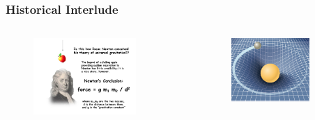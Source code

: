\documentclass{beamer}
\begin{document}
\begin{frame}
\frametitle{Historical Interlude}

  \begin{columns}[c]


    \begin{figure}[htb!]
      \centering
      \includegraphics[width=0.8\textwidth]{fig.Newton.jpg}
    \end{figure}


    \begin{figure}[htb!]
      \centering
      \includegraphics[width=0.8\textwidth]{fig.Einstein.jpg}
    \end{figure}

  \end{columns}

\end{frame}
\end{document}

